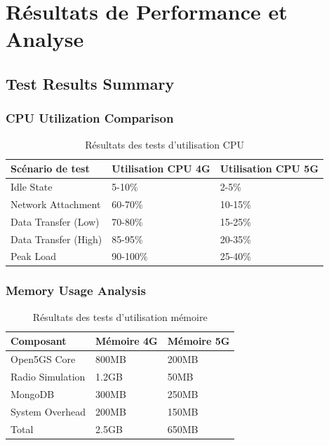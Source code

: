 \documentclass[12pt,a4paper]{report}
\begin{document}
\chapter{Résultats de Performance et Analyse}

\section{Test Results Summary}

\subsection{CPU Utilization Comparison}

\begin{table}[H]
\centering
\caption{Résultats des tests d'utilisation CPU}
\label{tab:cpu-results}
\begin{tabular}{@{}lll@{}}
\toprule
Scénario de test & Utilisation CPU 4G & Utilisation CPU 5G \\
\midrule
Idle State & 5-10\% & 2-5\% \\
Network Attachment & 60-70\% & 10-15\% \\
Data Transfer (Low) & 70-80\% & 15-25\% \\
Data Transfer (High) & 85-95\% & 20-35\% \\
Peak Load & 90-100\% & 25-40\% \\
\bottomrule
\end{tabular}
\end{table}

\subsection{Memory Usage Analysis}

\begin{table}[H]
\centering
\caption{Résultats des tests d'utilisation mémoire}
\label{tab:memory-results}
\begin{tabular}{@{}lll@{}}
\toprule
Composant & Mémoire 4G & Mémoire 5G \\
\midrule
Open5GS Core & 800MB & 200MB \\
Radio Simulation & 1.2GB & 50MB \\
MongoDB & 300MB & 250MB \\
System Overhead & 200MB & 150MB \\
Total & 2.5GB & 650MB \\
\bottomrule
\end{tabular}
\end{table}
\end{document}
